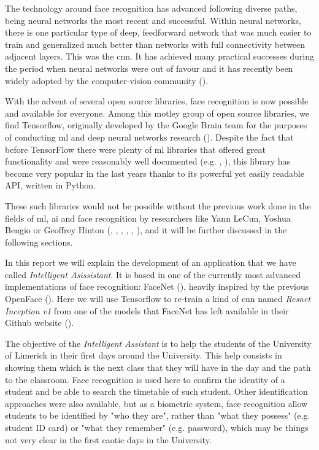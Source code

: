 The technology around face recognition has advanced following diverse paths, being neural networks the most recent and successful. Within neural networks, there is one particular type of deep, feedforward network that was much easier to train and generalized much better than networks with full connectivity between adjacent layers. This was the \gls{cnn}. It has achieved many practical successes during the period when neural networks were out of favour and it has recently been widely adopted by the computer-vision community (\cite{lecun2015deep}). 

With the advent of several open source libraries, face recognition is now possible and available for everyone. Among this motley group of open source libraries, we find Tensorflow, originally developed by the Google Brain team for the purposes of conducting \gls{ml} and deep neural networks research (\cite{tensorflow_main_website}). Despite the fact that before TensorFlow there were plenty of \gls{ml} libraries that offered great functionality and were reasonably well documented (e.g. \cite{theano_main_site}, \cite{caffe_main_site}), this library has become very popular in the last years thanks to its powerful yet easily readable API, written in Python. 

These such libraries would not be possible without the previous work done in the fields of \gls{ml}, \gls{ai} and face recognition by researchers like Yann LeCun, Yoshua Bengio or Geoffrey Hinton (\cite{rumelhart1985learning}, \cite{lecun1995convolutional}, \cite{lecun1998efficient}, \cite{bengio2009learning}, \cite{krizhevsky2012deep}, \cite{lecun2015deep}), and it will be further discussed in the following sections.

In this report we will explain the development of an application that we have called \textit{Intelligent Asissistant}. It is based in one of the currently most advanced implementations of face recognition: FaceNet (\cite{facenet_article}), heavily inspired by the previous OpenFace (\cite{amos2016openface}). Here we will use Tensorflow to re-train a kind of \gls{cnn} named \textit{Resnet Inception v1} from one of the models that FaceNet has left available in their Github website (\cite{facenet_github}).

The objective of the \textit{Intelligent Assistant} is to help the students of the University of Limerick in their first days around the University. This help consists in showing them which is the next class that they will have in the day and the path to the classroom. Face recognition is used here to confirm the identity of a student and be able to search the timetable of such student. Other identification approaches were also available, but as a biometric system, face recognition allow students to be identified by "who they are", rather than "what they possess" (e.g. student ID card) or "what they remember" (e.g. password), which may be things not very clear in the first caotic days in the University. 

